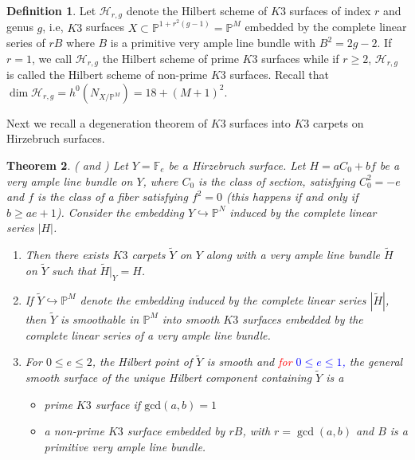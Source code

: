 \documentclass[11pt,twoside]{amsart}
\theoremstyle{plain}
\numberwithin{equation}{section}
\newtheorem{theorem}{Theorem}[section]
\theoremstyle{definition}
\newtheorem{definition}[theorem]{Definition}
\begin{document}
\begin{definition}\label{Hilbert schemes of K3 surfaces}
    Let $\mathcal{H}_{r,g}$ denote the Hilbert scheme of $K3$ surfaces of index $r$ and genus $g$, i.e, $K3$ surfaces $X \subset \mathbb{P}^{1+r^2(g-1)} = \mathbb{P}^M$ embedded by the complete linear series of $rB$ where $B$ is a primitive very ample line bundle with $B^2 = 2g-2$. If $r = 1$, we call $\mathcal{H}_{r,g}$ the Hilbert scheme of prime $K3$ surfaces while if $r \geq 2$, $\mathcal{H}_{r,g}$ is called the Hilbert scheme of non-prime $K3$ surfaces. Recall that $\operatorname{dim}\mathcal{H}_{r,g} = h^0(N_{X/\mathbb{P}^M}) =  18+(M+1)^2$.
\end{definition}
\color{black}

Next we recall a degeneration theorem of $K3$ surfaces into $K3$ carpets on Hirzebruch surfaces.

\begin{theorem}\label{degeneration into $K3$ carpets}(\cite[\sout{Theorem $4.1$} \textcolor{blue}{Theorems $3.1, 4.3, 4.4, 5.1$}]{BMR21} and \cite[\sout{Theorem $2.9$} \textcolor{blue}{Proposition $1.7$, Theorems $3.5, 4.1$}]{GP97})
Let $Y = \mathbb{F}_e$ be a Hirzebruch surface. Let $H = aC_0+bf$ be a very ample line bundle on $Y$, where $C_0$ is the class of section, satisfying $C_0^2 = -e$ and $f$ is the class of a fiber satisfying $f^2 = 0$ (this happens if and only if $b \geq ae+1$). Consider the embedding $Y \hookrightarrow \mathbb{P}^N$ induced by the complete linear series $|H|$.  
\begin{enumerate}
    \item Then there exists $K3$ carpets $\widetilde{Y}$ on $Y$ along with a very ample line bundle $\widetilde{H}$ on $\widetilde{Y}$ such that $\widetilde{H}|_Y = H$.

    \item If $\widetilde{Y} \hookrightarrow \mathbb{P}^M$ denote the embedding induced by the complete linear series $|\widetilde{H}|$, then $\widetilde{Y}$ is smoothable in $\mathbb{P}^M$ into smooth $K3$ surfaces embedded by the complete linear series of a very ample line bundle.

    \item For $0 \leq e \leq 2$, the Hilbert point of $\widetilde{Y}$ is smooth and \textcolor{red}{for} \textcolor{blue}{$0 \leq e \leq 1$,} the general smooth surface of the unique Hilbert component containing $\widetilde{Y}$ is a 
    \begin{itemize}
        \item[(a)] prime $K3$ surface if $\textrm{gcd}(a,b) = 1$ 
        \item[(b)] a non-prime $K3$ surface embedded by $rB$, with $r = \operatorname{gcd}(a,b)$ and $B$ is a primitive very ample line bundle. 
    \end{itemize}
\end{enumerate}
\end{theorem}
\end{document}
